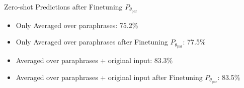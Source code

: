 \documentclass{beamer}
\begin{document}
\begin{frame}{Zero-shot Predictions after Finetuning $P_{\theta_{\text{par}}}$}
\begin{itemize}
        \item Only Averaged over paraphrases: 75.2\%\\
        \item Only Averaged over paraphrases {\color{green}after Finetuning $P_{\theta_{\text{par}}}$: 77.5\%}\\
        \medskip
        \medskip
        \medskip
        \item Averaged over paraphrases + original input: 83.3\%\\
        \item Averaged over paraphrases + original input {\color{green}after Finetuning $P_{\theta_{\text{par}}}$: 83.5\%}
\end{itemize}
\end{frame}



\end{document}
